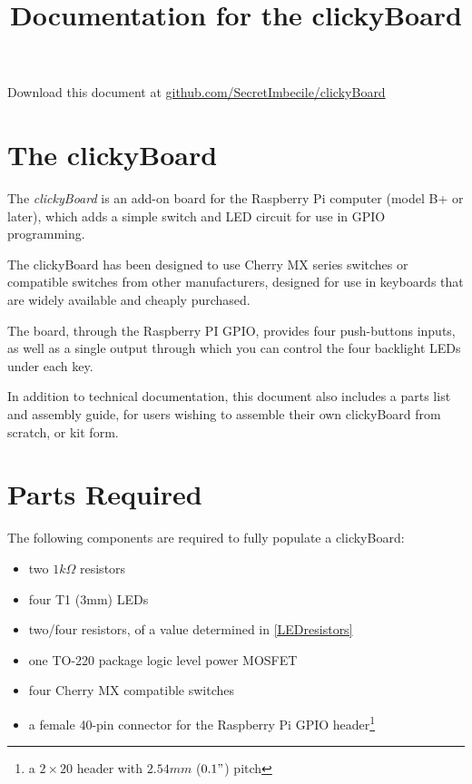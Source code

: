 \documentclass[10pt, a4paper, onesided]{article}
\title{Documentation for the clickyBoard}
\author{}
\date{}
\begin{document}
\maketitle
\vspace{-40pt}

Download this document at \href{https://github.com/SecretImbecile/clickyBoard}{github.com/SecretImbecile/clickyBoard}
\tableofcontents

\section{The clickyBoard}

	The \textit{clickyBoard} is an add-on board for the Raspberry Pi computer (model B+ or later), which adds a simple switch and LED circuit for use in GPIO programming.
	
	The clickyBoard has been designed to use Cherry MX series switches or compatible switches from other manufacturers, designed for use in keyboards that are widely available and cheaply purchased.
	
	The board, through the Raspberry PI GPIO, provides four push-buttons inputs, as well as a single output through which you can control the four backlight LEDs under each key.
	
	In addition to technical documentation, this document also includes a parts list and assembly guide, for users wishing to assemble their own clickyBoard from scratch, or kit form.

\newpage
\section{Parts Required}

	The following components are required to fully populate a clickyBoard:
	
	\begin{itemize}[noitemsep]
		\item two $1 k\Omega$ resistors
		\item four T1 (3mm) LEDs
		\item two/four resistors, of a value determined in \autoref{LEDresistors}
		\item one TO-220 package logic level power MOSFET
		\item four Cherry MX compatible switches
		\item a female 40-pin connector for the Raspberry Pi GPIO header\footnote{a $2\times20$ header with $2.54 mm$ ($0.1"$) pitch}
	\end{itemize}
	
\end{document}
